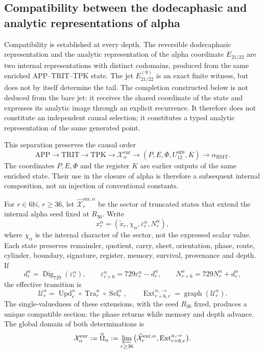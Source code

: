 \subsection{Compatibility between the dodecaphasic and analytic representations of alpha}
\label{subsec:alpha-publicaciones-completas}

Compatibility is established at every depth. The reversible
dodecaphasic representation and the analytic representation of the alpha
coordinate
\(E_{21/22}\) are two internal representations with distinct codomains,
produced from the same enriched APP--TRIT--TPK state. The jet
\(E_{21/22}^{(9)}\) is an exact finite witness, but does not by itself determine
the tail. The completion constructed below is not deduced from the bare
jet: it receives the shared coordinate of the state and expresses its
analytic image through an explicit recurrence. It therefore does not constitute
an independent causal selection; it constitutes a typed analytic
representation of the same generated point.

This separation preserves the causal order
\[
 \mathrm{APP}\longrightarrow\mathrm{TRIT}\longrightarrow\mathrm{TPK}
 \longrightarrow\mathcal X_{\alpha}^{\mathrm{enr}}
 \longrightarrow (P,E,\Phi,U_{12}^{\mathrm{sgn}},K)
 \longrightarrow\alpha_{\mathrm{HMT}}.
\]
The coordinates \(P,E,\Phi\) and the register \(K\) are earlier outputs of
the same enriched state. Their use in the closure of alpha is therefore a
subsequent internal composition, not an injection of conventional
constants.

For \(r\in6\mathbb N\), \(r\ge36\), let
\(\widehat{\mathcal X}^{\mathrm{enr},\alpha}_r\) be the sector of truncated
states that extend the internal alpha seed fixed at \(R_{36}\). Write
\[
 x_r^\alpha=(\widetilde x_r,\chi_\alpha,
              \varepsilon_r^\alpha,N_r^\alpha),
\]
where \(\chi_\alpha\) is the internal character of the sector, not the expressed
scalar value. Each state preserves remainder, quotient, carry, sheet, orientation,
phase, route, cylinder, boundary, signature, register, memory, survival,
provenance and depth. If
\[
 d_r^\alpha=\operatorname{Dig}_{729}(\varepsilon_r^\alpha),\qquad
 \varepsilon_{r+6}^\alpha=729\varepsilon_r^\alpha-d_r^\alpha,
 \qquad N_{r+6}^\alpha=729N_r^\alpha+d_r^\alpha,
\]
the effective transition is
\[
 \mathcal U_r^\alpha=
 \operatorname{Upd}_r^\alpha\circ
 \operatorname{Tra}_r^\alpha\circ
 \operatorname{Sel}_r^\alpha,
 \qquad
 \operatorname{Ext}^{\alpha,\to}_{r+6,r}
 =\operatorname{graph}(\mathcal U_r^\alpha).
\]
The single-valuedness of these extensions, with the seed \(R_{36}\) fixed,
produces a unique compatible section: the phase returns while memory and
depth advance. The global domain of both determinations is
\begin{equation}
 \mathcal X_\alpha^{\mathrm{enr}}:=\widehat\Omega_\alpha
 :=\varprojlim_{r\ge36}
 \bigl(\widehat{\mathcal X}^{\mathrm{enr},\alpha}_r,
       \operatorname{Ext}^{\alpha,\to}_{r+6,r}\bigr).
 \label{eq:alpha-dominio-enriquecido-completo}
\end{equation}

